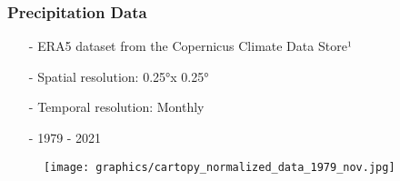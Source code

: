 \documentclass[xcolor=dvipsnames, aspectratio=169]{beamer}
\begin{document}
    
    \begin{comment}
            - data source (era5 from copernicus)
            - time and space resolution
            - visualization of data over time/ single point in time
            - some analysis
            
            - add link to data source? I didnt find out how. Maybe add sources slide at the end
    \end{comment}
    \begin{frame}
        \frametitle{Precipitation Data}
        \begin{minipage}[b]{6cm}
            \begin{itemize}
                \item[-] ERA5 dataset from the Copernicus Climate Data Store¹
                \item[-] Spatial resolution: 0.25°x 0.25° 
                \item[-] Temporal resolution: Monthly
                \item[-] 1979 - 2021
            \end{itemize}
        \end{minipage}
        \hspace{.2cm}
        \begin{minipage}{6cm}
            \begin{figure}
            \texttt{[image: graphics/cartopy\_normalized\_data\_1979\_nov.jpg]}
            \end{figure}
        \end{minipage}
    \end{frame}
    
    
    
\end{document}
